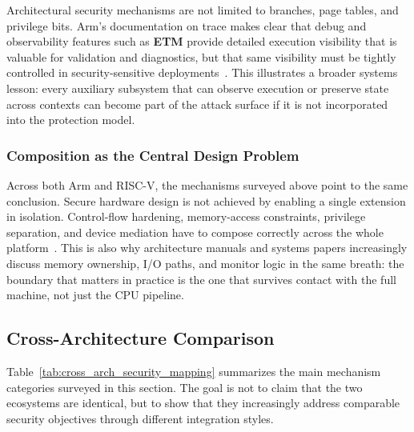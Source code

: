 Architectural security mechanisms are not limited to branches, page tables, and privilege bits. Arm's documentation on trace makes clear that debug and observability features such as \textbf{ETM} provide detailed execution visibility that is valuable for validation and diagnostics, but that same visibility must be tightly controlled in security-sensitive deployments~\cite{arm_understanding_trace}. This illustrates a broader systems lesson: every auxiliary subsystem that can observe execution or preserve state across contexts can become part of the attack surface if it is not incorporated into the protection model.

\subsubsection{Composition as the Central Design Problem}

Across both Arm and RISC-V, the mechanisms surveyed above point to the same conclusion. Secure hardware design is not achieved by enabling a single extension in isolation. Control-flow hardening, memory-access constraints, privilege separation, and device mediation have to compose correctly across the whole platform~\cite{armv-a,arm_cca_spec,arm_rme_spec,riscv_privileged,feng2024siopmp}. This is also why architecture manuals and systems papers increasingly discuss memory ownership, I/O paths, and monitor logic in the same breath: the boundary that matters in practice is the one that survives contact with the full machine, not just the CPU pipeline.

\subsection{Cross-Architecture Comparison}

Table~\ref{tab:cross_arch_security_mapping} summarizes the main mechanism categories surveyed in this section. The goal is not to claim that the two ecosystems are identical, but to show that they increasingly address comparable security objectives through different integration styles.

